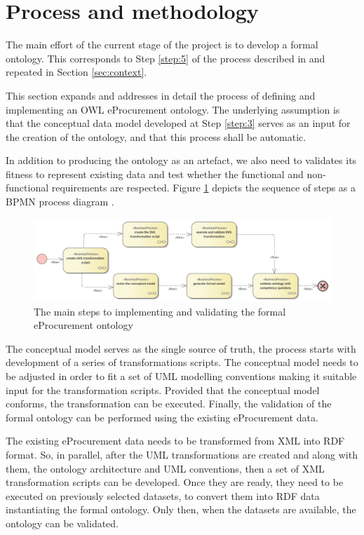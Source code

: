 \section{Process and methodology}
\label{sec:process-approach}
	
	The main effort of the current stage of the project is to develop a formal ontology. This corresponds to Step \ref{step:5} of the process described in \cite[3--15]{d2.01-2017} and repeated in Section \ref{sec:context}.	
	
	This section expands and addresses in detail the process of defining and implementing an OWL eProcurement ontology. The underlying assumption is that the conceptual data model developed at Step \ref{step:3} serves as an input for the creation of the ontology, and that this process shall be automatic. 
	
	In addition to producing the ontology as an artefact, we also need to validates its fitness to represent existing data and test whether the functional and non-functional requirements are respected. Figure \ref{fig:process-overview} depicts the sequence of steps as a BPMN process diagram \cite{bpmn-introduction}. 
	
	\begin{figure}[!ht]		
		\centering
		\includegraphics[width=\textwidth]{../img/processOverview.png}
		\caption{The main steps to implementing and validating the formal eProcurement ontology}
		\label{fig:process-overview}
	\end{figure}

	The conceptual model serves as the single source of truth, the process starts with development of a series of transformations scripts. The conceptual model needs to be adjusted in order to fit a set of UML modelling conventions \citep{costetchi2020b} making it suitable input for the transformation scripts. Provided that the conceptual model  conforms, the transformation can be executed. Finally, the validation of the formal ontology can be performed using the existing eProcurement data.
	
	
	The existing eProcurement data needs to be transformed from XML into RDF format. So, in parallel, after the UML transformations are created and along with them, the ontology architecture and UML conventions, then a set of XML transformation scripts can be developed. Once they are ready, they need to be executed on previously selected datasets, to convert them into RDF data instantiating the formal ontology. Only then, when the datasets are available, the ontology can be validated. 
	
